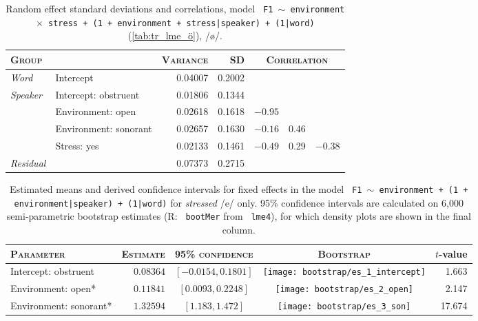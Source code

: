 \begin{table}[H]
  \centering\small
  \begin{tabular}{llrrrrr}
    \toprule
    \textsc{Group} & \textsc{} & \textsc{Variance} & \textsc{SD} & \multicolumn{3}{c}{\textsc{Correlation}}\\
    \midrule
    \multirow{1}{*}{\textit{Word}} & Intercept & 0.04007 & 0.2002 & & &  \\
    \midrule
    \multirow{4}{*}{\textit{Speaker}} & Intercept: obstruent & 0.01806 &  0.1344  \\
                & Environment: open                        & 0.02618 & 0.1618  & $-0.95$   \\
                & Environment: sonorant                    &0.02657 &  0.1630 & $ -0.16$ & 0.46    \\
                & Stress: yes                              & 0.02133 & 0.1461  & $-0.49$ & 0.29 & $-0.38$ \\
    \midrule
    \textit{Residual} & & 0.07373 & 0.2715 \\
    \bottomrule
  \end{tabular}
  \caption[\texttt{\footnotesize F1 $\sim$ environment$\times$stress + (1 + environment + stress|speaker) + (1|word)}, /e/]{Random effect standard deviations and correlations, model \texttt{ F1 $\sim$ environment $\times$ stress + (1 + environment + stress|speaker) + (1|word)} (\cref{tab:tr_lme_ö}), /ø/.}
  \label{tab:tr_lme_ö_random}
\end{table}

\begin{table}[H]
  \centering
  \begin{tabular}{lrccr}
    \toprule
    \textsc{Parameter} & \textsc{Estimate} & \textsc{95\% confidence} & \textsc{Bootstrap} & $t$-value\\
    \midrule
    Intercept: obstruent & $0.08364$ & $[-0.0154, 0.1801]$ & \texttt{[image: bootstrap/es\_1\_intercept]} & 1.663 \\
    Environment: open* & $0.11841$ & $[0.0093, 0.2248]$ & \texttt{[image: bootstrap/es\_2\_open]} & 2.147\\
    Environment: sonorant* & $1.32594$ & $[1.183, 1.472]$ & \texttt{[image: bootstrap/es\_3\_son]} & 17.674\\
    \bottomrule
  \end{tabular}
  \caption[\texttt{\footnotesize F1 $\sim$ environment + (1 + environment|speaker) + (1|word)}, /e/]{Estimated means and derived confidence intervals for fixed effects in the model \texttt{ F1 $\sim$ environment + (1 + environment|speaker) + (1|word)} for \emph{stressed} /e/ only. 95\% confidence intervals are calculated on 6,000 semi-parametric bootstrap estimates (R: \texttt{ bootMer} from \texttt{ lme4}), for which density plots are shown in the final column. }
  \label{tab:tr_lme_e_stressed}
\end{table}

